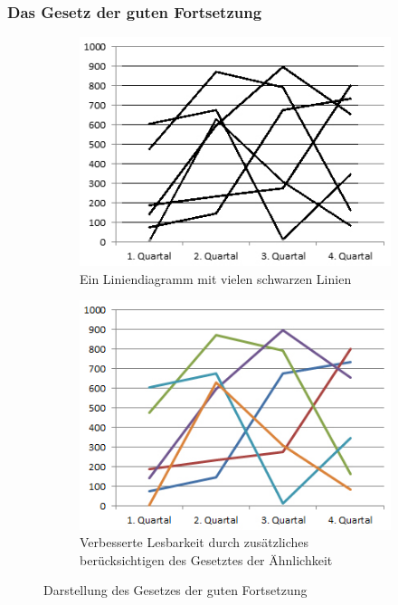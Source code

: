 \subsubsection{Das Gesetz der guten Fortsetzung}
\begin{figure}[ht]
\begin{subfigure}{.5\linewidth}
  \centering
  \includegraphics[width=.95\linewidth]{img/gFort}  
  \caption{Ein Liniendiagramm mit vielen schwarzen Linien}
  \label{fig:fort1}
\end{subfigure}
\begin{subfigure}{.5\linewidth}
  \centering
  \includegraphics[width=.95\linewidth]{img/gFortC}  
  \caption{Verbesserte Lesbarkeit durch zusätzliches berücksichtigen des Gesetztes der Ähnlichkeit}
  \label{fig:fort2}
\end{subfigure}
\caption[Gesetz der Fortsetzung]{Darstellung des Gesetzes der guten Fortsetzung}
\label{fig:erfahrung}
\end{figure}

